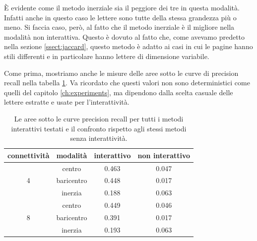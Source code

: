 \`E evidente come il metodo inerziale sia il peggiore dei tre in questa modalit\`a. Infatti anche in questo caso le lettere sono tutte della stessa grandezza pi\`u o meno. Si faccia caso, per\`o, al fatto che il metodo inerziale \`e il migliore nella modalit\`a non interattiva. Questo \`e dovuto al fatto che, come avevamo predetto nella sezione \ref{ssect:jaccard}, questo metodo \`e adatto ai casi in cui le pagine hanno stili differenti e in particolare hanno lettere di dimensione variabile.

Come prima, mostriamo anche le misure delle aree sotto le curve di precision recall nella tabella \ref{tab:area_interactive}. Va ricordato che questi valori non sono deterministici come quelli del capitolo \ref{ch:experiments}, ma dipendono dalla scelta casuale delle lettere estratte e usate per l'interattivit\`a.

\begin{table}
    \centering
    \begin{tabular}{c|c|c|c}
        connettivit\`a & modalit\`a & interattivo & non interattivo  \\
        \hline
        \multirow{3}{1em}{4} & centro & 0.463 & 0.047 \\
        & baricentro & 0.448 & 0.017 \\
        & inerzia & 0.188 & 0.063 \\
        \hline
        \multirow{3}{1em}{8} & centro & 0.449 & 0.046 \\
        & baricentro & 0.391 & 0.017 \\
        & inerzia & 0.193 & 0.063 \\
    \end{tabular}
    \caption{Le aree sotto le curve precision recall per tutti i metodi interattivi testati e il confronto rispetto agli stessi metodi senza interattivit\`a.}
    \label{tab:area_interactive}
\end{table}